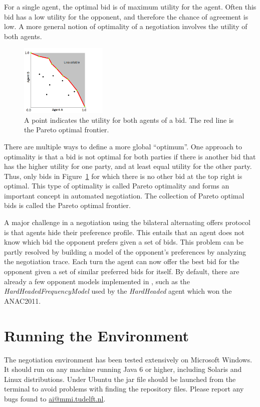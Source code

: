 \documentclass[]{article}
\begin{document}
For a single agent, the optimal bid is of maximum utility for the agent. Often this bid has a low utility for the opponent, and therefore the chance of agreement is low. A more general notion of optimality of a negotiation involves the utility of both agents.
\begin{figure}[htb]
	\centering
	\includegraphics[width=0.37\textwidth]{media/image5.png}
\caption{A point indicates the utility for both agents of a bid. The red line is the Pareto optimal frontier.}\label{Fig:utility plot}
\end{figure}

There are multiple ways to define a more global ``optimum''. One approach to optimality is that a bid is not optimal for both parties if there is another bid that has the higher utility for one party, and at least equal utility for the other party. Thus, only bids in Figure~\ref{Fig:utility plot} for which there is no other bid at the top right is optimal. This type of optimality is called Pareto optimality and forms an important concept in automated negotiation. The collection of Pareto optimal bids is called the Pareto optimal frontier.

A major challenge in a negotiation using the bilateral alternating offers protocol is that agents hide their preference profile. This entails that an agent does not know which bid the opponent prefers given a set of bids. This problem can be partly resolved by building a model of the opponent's preferences by analyzing the negotiation trace. Each turn the agent can now offer the best bid for the opponent given a set of similar preferred bids for itself. By default, there are already a few opponent models implemented in \Genius, such as the \textit{HardHeadedFrequencyModel} used by the \textit{HardHeaded} agent which won the ANAC2011.
 
\section{Running the Environment}
The negotiation environment has been tested extensively on Microsoft Windows. It should run on any machine running Java 6 or higher, including Solaris and Linux distributions. Under Ubuntu the jar file should be launched from the terminal to avoid problems with finding the repository files. Please report any bugs found to \url{ai@mmi.tudelft.nl}.
\end{document}
